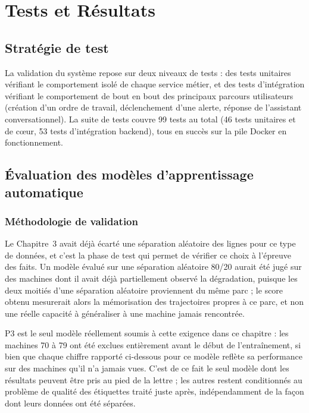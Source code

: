 \chapter{Tests et Résultats}

\section{Stratégie de test}

La validation du système repose sur deux niveaux de tests : des tests unitaires vérifiant le comportement isolé de chaque service métier, et des tests d'intégration vérifiant le comportement de bout en bout des principaux parcours utilisateurs (création d'un ordre de travail, déclenchement d'une alerte, réponse de l'assistant conversationnel). La suite de tests couvre 99 tests au total (46 tests unitaires et de cœur, 53 tests d'intégration backend), tous en succès sur la pile Docker en fonctionnement.

\section{Évaluation des modèles d'apprentissage automatique}

\subsection{Méthodologie de validation}

Le Chapitre~3 avait déjà écarté une séparation aléatoire des lignes pour ce type de données, et c'est la phase de test qui permet de vérifier ce choix à l'épreuve des faits. Un modèle évalué sur une séparation aléatoire 80/20 aurait été jugé sur des machines dont il avait déjà partiellement observé la dégradation, puisque les deux moitiés d'une séparation aléatoire proviennent du même parc ; le score obtenu mesurerait alors la mémorisation des trajectoires propres à ce parc, et non une réelle capacité à généraliser à une machine jamais rencontrée.

P3 est le seul modèle réellement soumis à cette exigence dans ce chapitre : les machines 70 à 79 ont été exclues entièrement avant le début de l'entraînement, si bien que chaque chiffre rapporté ci-dessous pour ce modèle reflète sa performance sur des machines qu'il n'a jamais vues. C'est de ce fait le seul modèle dont les résultats peuvent être pris au pied de la lettre ; les autres restent conditionnés au problème de qualité des étiquettes traité juste après, indépendamment de la façon dont leurs données ont été séparées.

